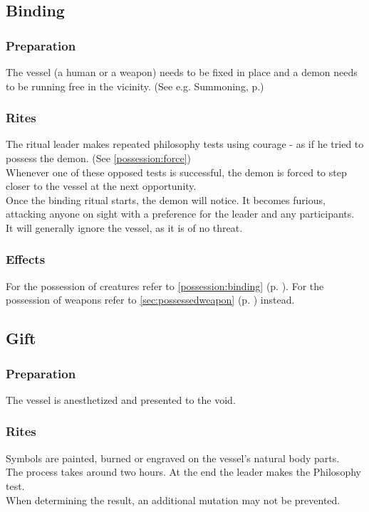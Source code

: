 \subsection*{Binding}
\label{ritual:binding}
\subsubsection*{Preparation}
The vessel (a human or a weapon) needs to be fixed in place and a demon needs to be running free in the vicinity.
(See e.g. Summoning, p.\pageref{ritual:summoning})
\subsubsection*{Rites}
The ritual leader makes repeated philosophy tests using courage
- as if he tried to possess the demon.
(See \ref{possession:force})
\\%
Whenever one of these opposed tests is successful,
the demon is forced to step closer to the vessel at the next opportunity.
\\%
Once the binding ritual starts, the demon will notice.
It becomes furious, attacking anyone on sight with a preference for the leader and any participants.
It will generally ignore the vessel, as it is of no threat.
\subsubsection*{Effects}
For the possession of creatures refer to \ref{possession:binding} (p. \pageref{possession:binding}).
For the possession of weapons refer to \ref{sec:possessedweapon} (p. \pageref{sec:possessedweapon}) instead.

\subsection*{Gift}
\subsubsection*{Preparation}
The vessel is anesthetized and presented to the void.
\subsubsection*{Rites}
Symbols are painted, burned or engraved on the vessel's natural body parts.
\\%
The process takes around two hours.
At the end the leader makes the Philosophy test.
\\%
When determining the result,
	an additional mutation may not be prevented.
